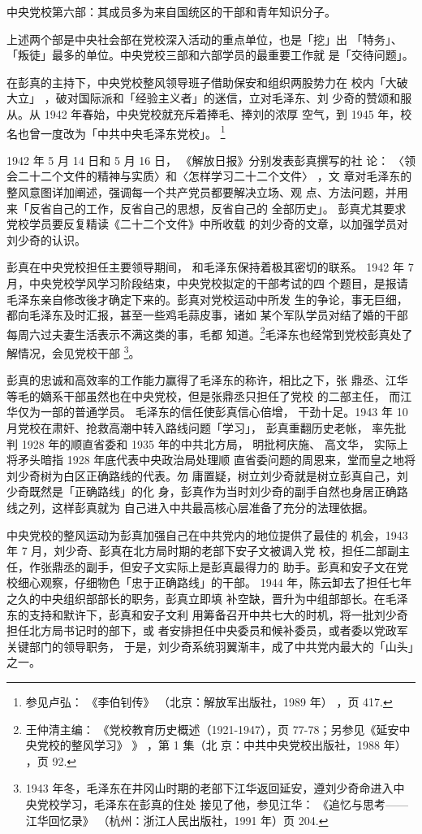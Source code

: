 中央党校第六部：其成员多为来自国统区的干部和青年知识分子。

上述两个部是中央社会部在党校深入活动的重点单位，也是「挖」出
「特务」、「叛徒」最多的单位。中央党校三部和六部学员的最重要工作就
是「交待问题」。

在彭真的主持下，中央党校整风领导班子借助保安和组织两股势力在
校内「大破大立」
，破对国际派和「经验主义者」的迷信，立对毛泽东、刘
少奇的赞颂和服从。从 1942 年春始，中央党校就充斥着捧毛、捧刘的浓厚
空气，到 1945 年，校名也曾一度改为「中共中央毛泽东党校」。
\footnote{参见卢弘：
《李伯钊传》
（北京：解放军出版社，1989 年）
，页 417.} 

1942 年 5 月 14 日和 5 月 16 日，
《解放日报》分别发表彭真撰写的社
论：
〈领会二十二个文件的精神与实质〉和〈怎样学习二十二个文件〉
，文
章对毛泽东的整风意图详加阐述，强调每一个共产党员都要解决立场、观
点、方法问题，并用来「反省自己的工作，反省自己的思想，反省自己的
全部历史」。
彭真尤其要求党校学员要反复精读《二十二个文件》中所收载
的刘少奇的文章，以加强学员对刘少奇的认识。

彭真在中央党校担任主要领导期间，
和毛泽东保持着极其密切的联系。
1942 年 7 月，中央党校学风学习阶段结束，中央党校拟定的干部考试的四
个题目，是报请毛泽东亲自修改後才确定下来的。彭真对党校运动中所发
生的争论，事无巨细，都向毛泽东及时汇报，甚至一些鸡毛蒜皮事，诸如
某个军队学员对结了婚的干部每周六过夫妻生活表示不满这类的事，毛都
知道。\footnote{王仲清主编：
《党校教育历史概述（1921-1947），页 77-78；另参见《延安中央党校的整风学习》
》
，第 1 集（北
京：中共中央党校出版社，1988 年）
，页 92.}毛泽东也经常到党校彭真处了解情况，会见党校干部
\footnote{ 1943 年冬，毛泽东在井冈山时期的老部下江华返回延安，遵刘少奇命进入中央党校学习，毛泽东在彭真的住处
接见了他，参见江华：
《追忆与思考——江华回忆录》
（杭州：浙江人民出版社，1991 年）页 204.}。

彭真的忠诚和高效率的工作能力赢得了毛泽东的称许，相比之下，张
鼎丞、江华等毛的嫡系干部虽然也在中央党校，但是张鼎丞只担任了党校
的二部主任，
而江华仅为一部的普通学员。
毛泽东的信任使彭真信心倍增，
干劲十足。1943 年 10 月党校在肃奸、抢救高潮中转入路线问题「学习」，
彭真重翻历史老帐，
率先批判 1928 年的顺直省委和 1935 年的中共北方局，
明批柯庆施、
高文华，
实际上将矛头暗指 1928 年底代表中央政治局处理顺
直省委问题的周恩来，堂而皇之地将刘少奇树为白区正确路线的代表。勿
庸置疑，树立刘少奇就是树立彭真自己，刘少奇既然是「正确路线」的化
身，彭真作为当时刘少奇的副手自然也身居正确路线之列，这样彭真就为
自己进入中共最高核心层准备了充分的法理依据。

中央党校的整风运动为彭真加强自己在中共党内的地位提供了最佳的
机会，1943 年 7 月，刘少奇、彭真在北方局时期的老部下安子文被调入党
校，担任二部副主任，作张鼎丞的副手，但安子文实际上是彭真最得力的
助手。彭真和安子文在党校细心观察，仔细物色「忠于正确路线」的干部。
1944 年，陈云卸去了担任七年之久的中央组织部部长的职务，彭真立即填
补空缺，晋升为中组部部长。在毛泽东的支持和默许下，彭真和安子文利
用筹备召开中共七大的时机，将一批刘少奇担任北方局书记时的部下，或
者安排担任中央委员和候补委员，或者委以党政军关键部门的领导职务，
于是，刘少奇系统羽翼渐丰，成了中共党内最大的「山头」之一。

